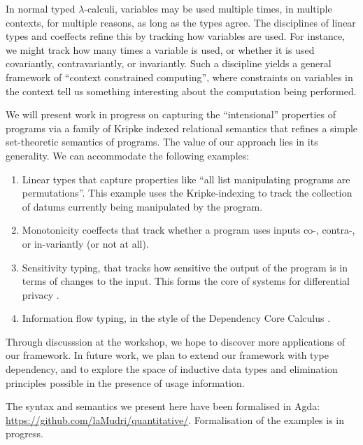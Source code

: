 In normal typed $\lambda$-calculi, variables may be used multiple
times, in multiple contexts, for multiple reasons, as long as the
types agree. The disciplines of linear types \cite{girard87linear} and
coeffects \cite{PetricekOM14,BrunelGMZ14,GhicaS14} refine this by
tracking how variables are used. For instance, we
might track how many times a variable is used, or whether it is used
covariantly, contravariantly, or invariantly. Such a discipline yields a
general framework of ``context constrained computing'', where
constraints on variables in the context tell us something interesting
about the computation being performed.

We will present work in progress on capturing the ``intensional''
properties of programs via a family of Kripke indexed relational
semantics that refines a simple set-theoretic semantics of
programs. The value of our approach lies in its generality. We can
accommodate the following examples:
\begin{enumerate}
\item Linear types that capture properties like ``all list
  manipulating programs are permutations''. This example uses the
  Kripke-indexing to track the collection of datums currently being
  manipulated by the program.
\item Monotonicity coeffects that track whether a program uses inputs
  co-, contra-, or in-variantly (or not at all).
\item Sensitivity typing, that tracks how sensitive the output of the
  program is in terms of changes to the input. This forms the core of
  systems for differential privacy \cite{reed10distance}.
\item Information flow typing, in the style of the Dependency Core
  Calculus \cite{abadi99core}.
\end{enumerate}
Through discusssion at the workshop, we hope to discover more
applications of our framework. In future work, we plan to extend our
framework with type dependency, and to explore the space of inductive
data types and elimination principles possible in the presence of
usage information.

The syntax and semantics we present here have been formalised in Agda:
\url{https://github.com/laMudri/quantitative/}. Formalisation of the
examples is in progress.

